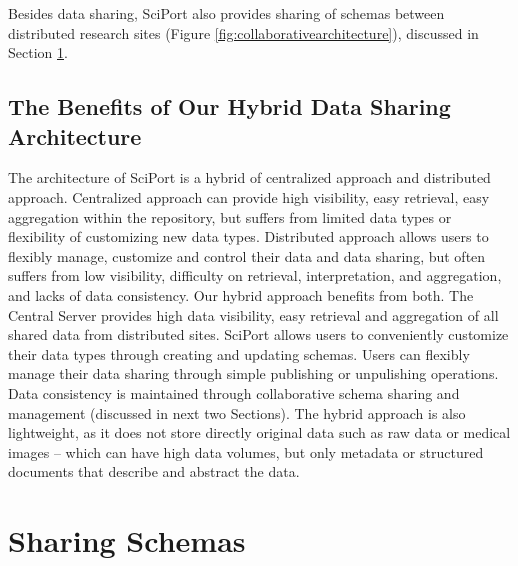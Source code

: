\documentclass{doublecol-new}
\theoremstyle{TH}{
\newtheorem{lemma}{Lemma}
\newtheorem{theorem}[lemma]{Theorem}
\newtheorem{corrolary}[lemma]{Corrolary}
\newtheorem{conjecture}[lemma]{Conjecture}
\newtheorem{proposition}[lemma]{Proposition}
\newtheorem{claim}[lemma]{Claim}
\newtheorem{stheorem}[lemma]{Wrong Theorem}
\newtheorem{algorithm}{Algorithm}
}
\theoremstyle{THrm}{
\newtheorem{definition}{Definition}[section]
\newtheorem{question}{Question}[section]
\newtheorem{remark}{Remark}
\newtheorem{scheme}{Scheme}
}
\theoremstyle{THhit}{
\newtheorem{case}{Case}[section]
}
\begin{document}


Besides data sharing, SciPort also provides sharing of schemas
between distributed research sites (Figure
\ref{fig:collaborativearchitecture}), discussed in Section
\ref{sec:sharingschema}.






\subsection{The Benefits of Our Hybrid Data Sharing Architecture}

The architecture of SciPort is a hybrid of centralized approach and
distributed approach.  Centralized approach can provide high
visibility, easy retrieval, easy aggregation within the repository,
but suffers from limited data types or flexibility of customizing
new data types. Distributed approach allows users to flexibly
manage, customize and control their data and data sharing,  but
often suffers from low visibility, difficulty on retrieval,
interpretation, and aggregation, and lacks of data consistency. Our
hybrid approach benefits from both. The Central Server provides high
data visibility, easy retrieval and aggregation of all shared data
from distributed sites.   SciPort allows users to conveniently
customize their data types through creating and updating schemas.
Users can flexibly manage their data sharing through simple
publishing or unpulishing operations.  Data consistency is
maintained through collaborative schema sharing and management
(discussed in next two Sections). The hybrid approach is also
lightweight, as it does not store directly original data such as raw
data or medical images -- which can have high data volumes, but only
metadata or structured documents that describe and abstract the
data.



\section{Sharing Schemas} \label{sec:sharingschema}
\end{document}
